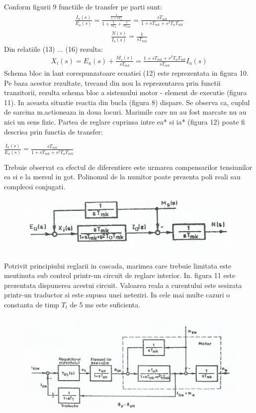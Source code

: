 \documentclass[11pt]{article}
\begin{document}
Conform figurii 9 functiile de transfer pe parti sunt:
\begin{align}
\frac{I_a(s)}{E_a(s)}=\frac{\frac{1}{1+sT_a}}{1+\frac{1}{sT_a}+\frac{1}{sT_{mk}}}=\frac{sT_{mk}}{1+sT_{mk}+s^2T_aT_{mk}}
\end{align}
\begin{align}
\frac{N(s)}{I_a(s)}=\frac{1}{sT_{mk}}
\end{align}
Din relatiile (13) ... (16) rezulta:
\begin{align}
X_i(s)=E_a(s)+\frac{M_s(s)}{sT_{mk}}=\frac{1+sT_{mk}+s^2T_aT_{mk}}{sT_{mk}}I_a(s)
\end{align}
Schema bloc in lant corespunzatoare ecuatiei (12) este reprezentata in figura 10. 
Pe baza acestor rezultate, trecand din nou la reprezentarea prin functii tranzitorii, rezulta schema bloc a sistemului motor - element de executie (figura 11). In aceasta situatie reactia din bucla (figura 8) dispare. Se observa ca, cuplul de sarcina m.actioneaza in doua locuri. Marimile care nu au fost marcate nu au nici un sens fizic. Partea de reglare cuprinsa intre ea* si ia* (figura 12) poate fi descrisa prin functia de transfer: 
\begin{center}
$\frac{I_a(s)}{E_a(s)}=\frac{sT_{mk}}{1+sT_{mk}+s^2T_aT_{mk}}$
\end{center}
Trebuie observat ca efectul de diferentiere este urmarea compensarilor tensiunilor ea si e la mersul in got. Polinomul de la numitor poate prezenta poli reali sau complecsi conjugati.
\begin{figure}[H]
	\centering
	\includegraphics[width=.7\linewidth]{fig11.png}
	\label{fig:test2}
\end{figure}
Potrivit principiului reglarii in cascada, marimea care trebuie limitata este mentinuta sub control printr-un circuit de reglare interior. In. figura 11 este prezentata dispunerea acestui circuit. Valoarea reala a curentului este sesizata printr-un traductor si este supusa unei neteziri. In cele mai multe cazuri o constanta de timp $T_t$ de 5 ms este suficienta.
\begin{figure}[H]
	\centering
	\includegraphics[width=.9\linewidth]{fig12.png}
	\label{fig:test2}
\end{figure}
\end{document}
